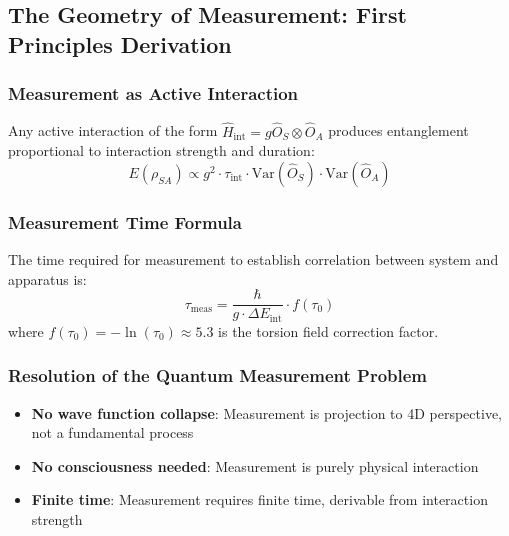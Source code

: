 \subsection{The Geometry of Measurement: First Principles Derivation}

\subsubsection{Measurement as Active Interaction}

\begin{theorem}
Any active interaction of the form $\hat{H}_{\text{int}} = g \hat{O}_S \otimes \hat{O}_A$ produces entanglement proportional to interaction strength and duration:
\begin{equation}
    E(\rho_{SA}) \propto g^2 \cdot \tau_{\text{int}} \cdot \text{Var}(\hat{O}_S) \cdot \text{Var}(\hat{O}_A)
\end{equation}
\end{theorem}

\subsubsection{Measurement Time Formula}

\begin{theorem}
The time required for measurement to establish correlation between system and apparatus is:
\begin{equation}
    \boxed{\tau_{\text{meas}} = \frac{\hbar}{g \cdot \Delta E_{\text{int}}} \cdot f(\tau_0)}
\end{equation}
where $f(\tau_0) = -\ln(\tau_0) \approx 5.3$ is the torsion field correction factor.
\end{theorem}

\subsubsection{Resolution of the Quantum Measurement Problem}

\begin{itemize}
    \item \textbf{No wave function collapse}: Measurement is projection to 4D perspective, not a fundamental process
    \item \textbf{No consciousness needed}: Measurement is purely physical interaction
    \item \textbf{Finite time}: Measurement requires finite time, derivable from interaction strength
\end{itemize}

